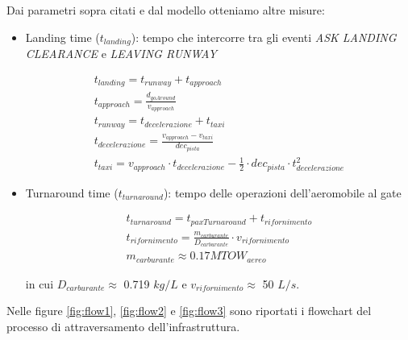 \documentclass[a4paper, 12pt]{article}
\begin{document}
Dai parametri sopra citati e dal modello otteniamo altre misure:
\begin{itemize}
	\item Landing time ($t_{landing}$): tempo che intercorre tra gli eventi \textit{ASK LANDING CLEARANCE} e \textit{LEAVING RUNWAY}

	\begin{align}
	t_{landing} = t_{runway} + t_{approach}\\
	t_{approach} = \frac{d_{goAround}}{v_{approach}}\\
	t_{runway} = t_{decelerazione} + t_{taxi}\\
	t_{decelerazione} = \frac{v_{approach} - v_{taxi}}{dec_{pista}}\\
	t_{taxi} = v_{approach} \cdot  t_{decelerazione} - \frac{1}{2}  \cdot   dec_{pista} \cdot   t_{decelerazione}^2
	\end{align}

	\newpage

	\item Turnaround time ($t_{turnaround}$): tempo delle operazioni dell'aeromobile al gate

\begin{align}
	t_{turnaround} = t_{paxTurnaround} + t_{rifornimento}\\
	t_{rifornimento} = \frac{m_{carburante}}{D_{carburante}} \cdot v_{rifornimento}\\
	m_{carburante} \approx 0.17 MTOW_{aereo}
\end{align}
	
	in cui $D_{carburante} \approx $  0.719 $kg/L$ \cite{avgas_wikipedia} e $v_{rifornimento}\approx $ 50 $L/s$\cite{austerman_1997}.

\end{itemize}

	Nelle figure \ref{fig:flow1}, \ref{fig:flow2} e \ref{fig:flow3} sono riportati i flowchart del processo di attraversamento dell'infrastruttura.
\end{document}

